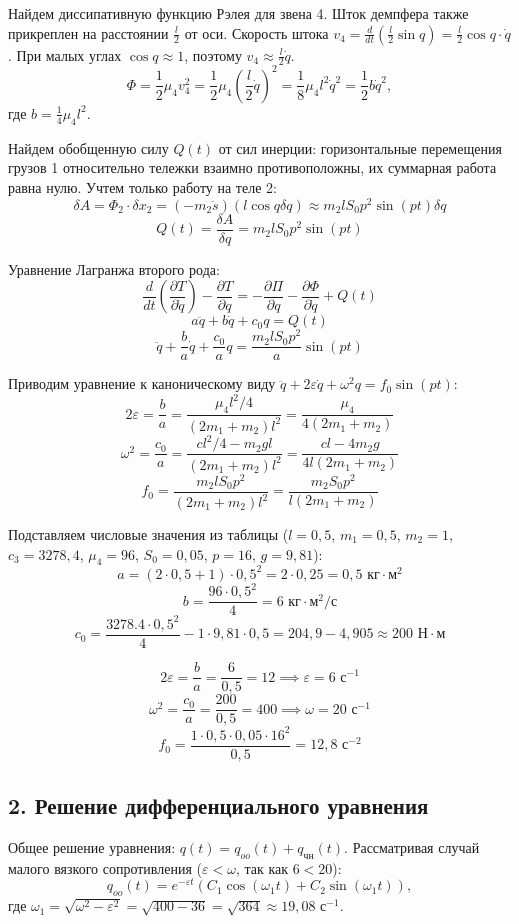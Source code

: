 \documentclass{article}
\begin{document}
Найдем диссипативную функцию Рэлея для звена 4. Шток демпфера также прикреплен на расстоянии $\frac{l}{2}$ от оси. Скорость штока $v_4 = \frac{d}{dt}(\frac{l}{2} \sin q) = \frac{l}{2} \cos q \cdot \dot{q}$. При малых углах $\cos q \approx 1$, поэтому $v_4 \approx \frac{l}{2} \dot{q}$.
$$\Phi = \frac{1}{2} \mu_4 v_4^2 = \frac{1}{2} \mu_4 \left( \frac{l}{2} \dot{q} \right)^2 = \frac{1}{8} \mu_4 l^2 \dot{q}^2 = \frac{1}{2} b \dot{q}^2,$$
где $b = \frac{1}{4}\mu_4 l^2$.

Найдем обобщенную силу $Q(t)$ от сил инерции: горизонтальные перемещения грузов 1 относительно тележки взаимно противоположны, их суммарная работа равна нулю. Учтем только работу на теле 2:
$$\delta A = \Phi_2 \cdot \delta x_2 = (-m_2 \ddot{s}) (l \cos q \delta q) \approx m_2 l S_0 p^2 \sin(pt) \delta q$$
$$Q(t) = \frac{\delta A}{\delta q} = m_2 l S_0 p^2 \sin(pt)$$

Уравнение Лагранжа второго рода:
$$\frac{d}{dt} \left( \frac{\partial T}{\partial \dot{q}} \right) - \frac{\partial T}{\partial q} = -\frac{\partial \Pi}{\partial q} - \frac{\partial \Phi}{\partial \dot{q}} + Q(t)$$
$$a \ddot{q} + b \dot{q} + c_{\text{0}} q = Q(t)$$
$$\ddot{q} + \frac{b}{a} \dot{q} + \frac{c_{\text{0}}}{a} q = \frac{m_2 l S_0 p^2}{a} \sin(pt)$$
\par
Приводим уравнение к каноническому виду $\ddot{q} + 2\varepsilon \dot{q} + \omega^2 q = f_0 \sin(pt)$:
$$2\varepsilon = \frac{b}{a} = \frac{\mu_4 l^2 / 4}{(2m_1 + m_2)l^2} = \frac{\mu_4}{4(2m_1 + m_2)}$$
$$\omega^2 = \frac{c_{\text{0}}}{a} = \frac{c l^2 / 4 - m_2 g l}{(2m_1 + m_2)l^2} = \frac{c l - 4 m_2 g}{4 l (2m_1 + m_2)}$$
$$f_0 = \frac{m_2 l S_0 p^2}{(2m_1 + m_2)l^2} = \frac{m_2 S_0 p^2}{l(2m_1 + m_2)}$$

Подставляем числовые значения из таблицы ($l=0,5$, $m_1=0,5$, $m_2=1$, $c_3=3278,4$, $\mu_4=96$, $S_0=0,05$, $p=16$, $g=9,81$):
$$a = (2 \cdot 0,5 + 1) \cdot 0,5^2 = 2 \cdot 0,25 = 0,5 \text{ кг}\cdot\text{м}^2$$
$$b = \frac{96 \cdot 0,5^2}{4} = 6 \text{ кг}\cdot\text{м}^2/\text{с}$$
$$c_{\text{0}} = \frac{3278.4 \cdot 0,5^2}{4} - 1 \cdot 9,81 \cdot 0,5 = 204,9 - 4,905 \approx 200 \text{ Н}\cdot\text{м}$$

$$2\varepsilon = \frac{b}{a} = \frac{6}{0,5} = 12 \implies \varepsilon = 6 \text{ с}^{-1}$$
$$\omega^2 = \frac{c_{\text{0}}}{a} = \frac{200}{0,5} = 400 \implies \omega = 20 \text{ с}^{-1}$$
$$f_0 = \frac{1 \cdot 0,5 \cdot 0,05 \cdot 16^2}{0,5} = 12,8 \text{ с}^{-2}$$

\subsection*{2. Решение дифференциального уравнения}
Общее решение уравнения: $q(t) = q_{oo}(t) + q_{\text{чн}}(t)$.
Рассматривая случай малого вязкого сопротивления ($\varepsilon < \omega$, так как $6 < 20$):
$$q_{oo}(t) = e^{-\varepsilon t} (C_1 \cos(\omega_1 t) + C_2 \sin(\omega_1 t)),$$
где $\omega_1 = \sqrt{\omega^2 - \varepsilon^2} = \sqrt{400 - 36} = \sqrt{364} \approx 19,08 \text{ с}^{-1}$.
\end{document}
